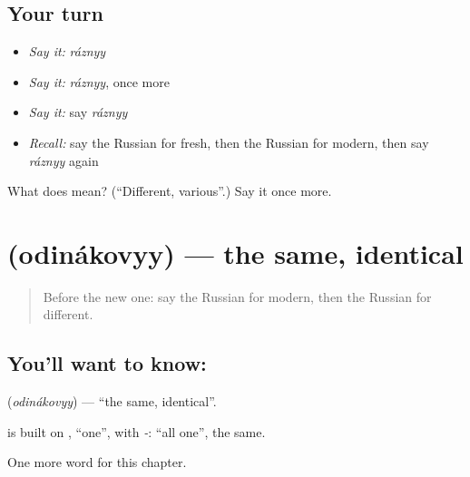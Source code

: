 \subsection*{Your turn}
\begin{itemize}
\raggedright
  \item \emph{Say it:} \emph{ráznyy}
  \item \emph{Say it:} \emph{ráznyy}, once more
  \item \emph{Say it:} say \emph{ráznyy}
  \item \emph{Recall:} say the Russian for fresh, then the Russian for modern, then say \emph{ráznyy} again
\end{itemize}

\begin{tcolorbox}[breakable,colback=teal!4,colframe=teal!35!black,title={Before you move on}]
What does  mean? (\textquotedblleft{}Different, various\textquotedblright{}.) Say it once more.
\end{tcolorbox}
\section[\texorpdfstring{\ru{одинаковый} (odinákovyy)}{одинаковый (odinákovyy)}]{ (odinákovyy) — the same, identical}

\label{lesson:RU-C218-odinakovyy}



\begin{quote}
Before the new one: say the Russian for modern, then the Russian for different.
\end{quote}

\subsection*{You'll want to know: }
\textbf{} (\emph{odinákovyy}) — \textquotedblleft{}the same, identical\textquotedblright{}.

\begin{cousinweb}
\textbf{} is built on \emph{}, \textquotedblleft{}one\textquotedblright{}, with \emph{-}: \textquotedblleft{}all one\textquotedblright{}, the same.
\end{cousinweb}

\begin{grammarlens}[title={What you've built}]
One more word for this chapter.
\end{grammarlens}

